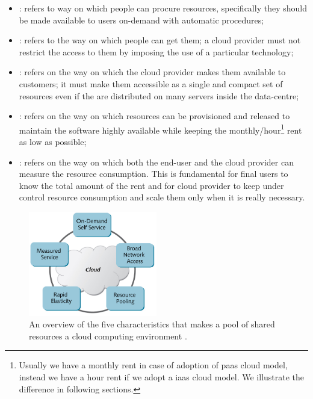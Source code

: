 \begin{itemize}
	\item{: refers to way on which people can procure resources, specifically
		they should be made available to users on-demand with automatic procedures;}
	\item{: refers to the way on which people can get them; a cloud provider
		must not restrict the access to them by imposing the use of a particular technology;}
	\item{: refers on the way on which the cloud provider makes them available to
		customers; it must make them accessible as a single and compact set of resources even if the are
		distributed on many servers inside the data-centre;}
	\item{: refers on the way on which resources can be provisioned and released
		to maintain the software highly available while keeping the monthly/hour\footnote{Usually we have a
		monthly rent in case of adoption of \acs{paas} cloud model, instead we have a hour rent if we adopt
		a \acs{iaas} cloud model. We illustrate the difference in following sections.} rent as low as possible;}
	\item{: refers on the way on which both the end-user and the cloud provider
		can measure the resource consumption. This is fundamental for final users to know the total amount of
		the rent and for cloud provider to keep under control resource consumption and scale them only when
		it is really necessary.}
\end{itemize}

\begin{figure}
	\centering{}
	\includegraphics[width=0.5\textwidth]{chapters/problem/images/cloud-characteristics.png}
	\caption[Key characteristics of cloud computing]{An overview of the five characteristics that makes a
		pool of shared resources a cloud computing environment \cite{cloudCharacteristics}.}
	\label{img:problemSpace-cloudComputing-characteristics}
\end{figure}

